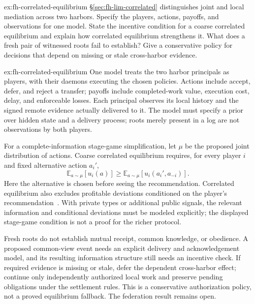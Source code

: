 \documentclass[11pt,a4paper]{article}
\theoremstyle{definition}
\theoremstyle{remark}
\begin{document}
\begin{pdexercise}[kind=Open,rating=3]{ex:fh-correlated-equilibrium}
\S\ref{sec:fh-lim-correlated} distinguishes joint and local mediation across two harbors. Specify the players, actions, payoffs, and observations for one model. State the incentive condition for a coarse correlated equilibrium and explain how correlated equilibrium strengthens it. What does a fresh pair of witnessed roots fail to establish? Give a conservative policy for decisions that depend on missing or stale cross-harbor evidence.
\end{pdexercise}
\begin{pdsolution}{ex:fh-correlated-equilibrium}
One model treats the two harbor principals as players, with their daemons executing the chosen policies. Actions include accept, defer, and reject a transfer; payoffs include completed-work value, execution cost, delay, and enforceable losses. Each principal observes its local history and the signed remote evidence actually delivered to it. The model must specify a prior over hidden state and a delivery process; roots merely present in a log are not observations by both players.

For a complete-information stage-game simplification, let $\mu$ be the proposed joint distribution of actions. Coarse correlated equilibrium requires, for every player $i$ and fixed alternative action $a_i'$,
\[
  \mathbb{E}_{a\sim\mu}[u_i(a)]
  \ge
  \mathbb{E}_{a\sim\mu}[u_i(a_i',a_{-i})].
\]
Here the alternative is chosen before seeing the recommendation. Correlated equilibrium also excludes profitable deviations conditioned on the player's recommendation~. With private types or additional public signals, the relevant information and conditional deviations must be modeled explicitly; the displayed stage-game condition is not a proof for the richer protocol.

Fresh roots do not establish mutual receipt, common knowledge, or obedience. A proposed common-view event needs an explicit delivery and acknowledgement model, and its resulting information structure still needs an incentive check. If required evidence is missing or stale, defer the dependent cross-harbor effect; continue only independently authorized local work and preserve pending obligations under the settlement rules. This is a conservative authorization policy, not a proved equilibrium fallback. The federation result remains open.
\end{pdsolution}
\end{document}
